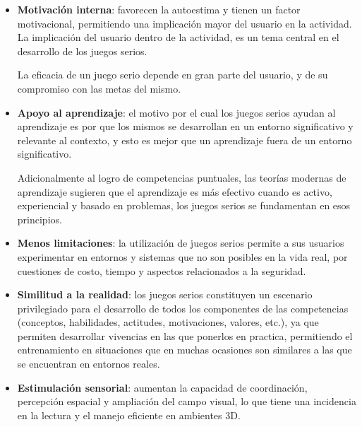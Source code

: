 \begin{itemize}

\item \textbf{Motivación interna}: favorecen la autoestima y tienen un factor
    motivacional\cite{guenaga2013serious}, permitiendo una implicación mayor del
    usuario en la actividad\cite{sg:aoverview}. La implicación del usuario
    dentro de la actividad, es un tema central en el desarrollo de los juegos
    serios\cite{charsky:2010}.

    La eficacia de un juego serio depende en gran parte del usuario, y de su
    compromiso con las metas del mismo\cite{sg:aoverview}.

\item \textbf{Apoyo al aprendizaje}: el motivo por el cual los juegos serios
    ayudan al aprendizaje es por que los mismos se desarrollan en un entorno
    significativo y relevante al contexto, y esto es mejor que un aprendizaje
    fuera de un entorno significativo\cite{sg:aoverview}.
    
   Adicionalmente al logro de competencias puntuales, las teorías modernas de
   aprendizaje sugieren que el aprendizaje es más efectivo cuando es activo,
   experiencial y basado en problemas, los juegos serios se fundamentan en esos
   principios\cite{guenaga2013serious}.

\item \textbf{Menos limitaciones}: la utilización de juegos serios permite a sus usuarios
    experimentar en entornos y sistemas que no son posibles en la vida real, por
    cuestiones de costo, tiempo y aspectos relacionados a la
    seguridad\cite{sg:aoverview}.

\item \textbf{Similitud a la realidad}: los juegos serios constituyen un
    escenario privilegiado para el desarrollo de todos los componentes de las
    competencias (conceptos, habilidades, actitudes, motivaciones, valores,
    etc.), ya que permiten desarrollar vivencias en las que ponerlos en practica,
    permitiendo el entrenamiento en situaciones que en muchas ocasiones son
    similares a las que se encuentran en entornos
    reales\cite{guenaga2013serious,sg:aoverview}.
    
\item \textbf{Estimulación sensorial}: aumentan la capacidad de coordinación,
    percepción espacial y ampliación del campo visual, lo que tiene una
    incidencia en la lectura y el manejo eficiente en ambientes
    3D\cite{guenaga2013serious}. 

\end{itemize}


